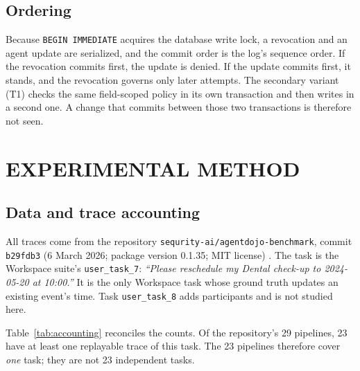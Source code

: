 \subsection{Ordering}
Because \texttt{BEGIN IMMEDIATE} acquires the database write lock, a revocation and an agent update are serialized, and the commit order is the log's sequence order. If the revocation commits first, the update is denied. If the update commits first, it stands, and the revocation governs only later attempts. The secondary variant (T1) checks the same field-scoped policy in its own transaction and then writes in a second one. A change that commits between those two transactions is therefore not seen.

\section{EXPERIMENTAL METHOD}
\label{sec:method}
\subsection{Data and trace accounting}
All traces come from the repository \texttt{sequrity-ai/}\allowbreak\texttt{agentdojo-benchmark}, commit \texttt{b29fdb3} (6 March 2026; package version 0.1.35; MIT license) \cite{agentdojorepo}. The task is the Workspace suite's \texttt{user\_task\_7}: \textit{``Please reschedule my Dental check-up to 2024-05-20 at 10:00.''} It is the only Workspace task whose ground truth updates an existing event's time. Task \texttt{user\_task\_8} adds participants and is not studied here.

Table~\ref{tab:accounting} reconciles the counts. Of the repository's 29 pipelines, 23 have at least one replayable trace of this task. The 23 pipelines therefore cover \emph{one} task; they are not 23 independent tasks.


